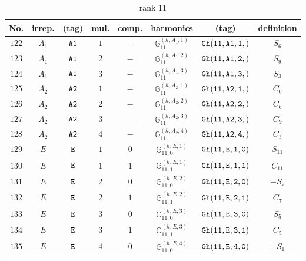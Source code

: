 \documentclass[fleqn,8pt]{jsarticle}
\begin{document}
\begin{table}[ht!]
\begin{center}
\caption{rank 11}
\renewcommand{\arraystretch}{1.3}
\begin{tabular}{cccccccc} \hline \hline
No. & irrep. & (tag) & mul. & comp. & harmonics & (tag) & definition \\ \hline
$ 122 $ & $ A_{1} $ & $ {\tt A1} $ & $ 1 $ & $ - $ & $ \mathbb{G}_{11}^{(h,A_{1},1)} $ & $ {\tt Gh(11,A1,1,)} $ & $ S_{6} $ \\
$ 123 $ & $ A_{1} $ & $ {\tt A1} $ & $ 2 $ & $ - $ & $ \mathbb{G}_{11}^{(h,A_{1},2)} $ & $ {\tt Gh(11,A1,2,)} $ & $ S_{9} $ \\
$ 124 $ & $ A_{1} $ & $ {\tt A1} $ & $ 3 $ & $ - $ & $ \mathbb{G}_{11}^{(h,A_{1},3)} $ & $ {\tt Gh(11,A1,3,)} $ & $ S_{3} $ \\
$ 125 $ & $ A_{2} $ & $ {\tt A2} $ & $ 1 $ & $ - $ & $ \mathbb{G}_{11}^{(h,A_{2},1)} $ & $ {\tt Gh(11,A2,1,)} $ & $ C_{0} $ \\
$ 126 $ & $ A_{2} $ & $ {\tt A2} $ & $ 2 $ & $ - $ & $ \mathbb{G}_{11}^{(h,A_{2},2)} $ & $ {\tt Gh(11,A2,2,)} $ & $ C_{6} $ \\
$ 127 $ & $ A_{2} $ & $ {\tt A2} $ & $ 3 $ & $ - $ & $ \mathbb{G}_{11}^{(h,A_{2},3)} $ & $ {\tt Gh(11,A2,3,)} $ & $ C_{9} $ \\
$ 128 $ & $ A_{2} $ & $ {\tt A2} $ & $ 4 $ & $ - $ & $ \mathbb{G}_{11}^{(h,A_{2},4)} $ & $ {\tt Gh(11,A2,4,)} $ & $ C_{3} $ \\
$ 129 $ & $ E $ & $ {\tt E} $ & $ 1 $ & $ 0 $ & $ \mathbb{G}_{11,0}^{(h,E,1)} $ & $ {\tt Gh(11,E,1,0)} $ & $ S_{11} $ \\
$ 130 $ & $ E $ & $ {\tt E} $ & $ 1 $ & $ 1 $ & $ \mathbb{G}_{11,1}^{(h,E,1)} $ & $ {\tt Gh(11,E,1,1)} $ & $ C_{11} $ \\
$ 131 $ & $ E $ & $ {\tt E} $ & $ 2 $ & $ 0 $ & $ \mathbb{G}_{11,0}^{(h,E,2)} $ & $ {\tt Gh(11,E,2,0)} $ & $ - S_{7} $ \\
$ 132 $ & $ E $ & $ {\tt E} $ & $ 2 $ & $ 1 $ & $ \mathbb{G}_{11,1}^{(h,E,2)} $ & $ {\tt Gh(11,E,2,1)} $ & $ C_{7} $ \\
$ 133 $ & $ E $ & $ {\tt E} $ & $ 3 $ & $ 0 $ & $ \mathbb{G}_{11,0}^{(h,E,3)} $ & $ {\tt Gh(11,E,3,0)} $ & $ S_{5} $ \\
$ 134 $ & $ E $ & $ {\tt E} $ & $ 3 $ & $ 1 $ & $ \mathbb{G}_{11,1}^{(h,E,3)} $ & $ {\tt Gh(11,E,3,1)} $ & $ C_{5} $ \\
$ 135 $ & $ E $ & $ {\tt E} $ & $ 4 $ & $ 0 $ & $ \mathbb{G}_{11,0}^{(h,E,4)} $ & $ {\tt Gh(11,E,4,0)} $ & $ - S_{1} $ \\

\end{tabular}
\end{center}
\end{table}
\end{document}
